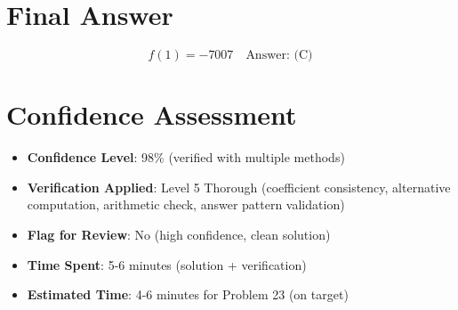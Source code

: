 \documentclass[]{article}
\begin{document}
\section*{Final Answer}

\[\boxed{f(1) = -7007 \quad \text{Answer: (C)}}\]

\section*{Confidence Assessment}
\begin{itemize}[leftmargin=*]
    \item \textbf{Confidence Level}: 98\% (verified with multiple methods)
    \item \textbf{Verification Applied}: Level 5 Thorough (coefficient consistency, alternative computation, arithmetic check, answer pattern validation)
    \item \textbf{Flag for Review}: No (high confidence, clean solution)
    \item \textbf{Time Spent}: 5-6 minutes (solution + verification)
    \item \textbf{Estimated Time}: 4-6 minutes for Problem 23 (on target)
\end{itemize}
\end{document}
